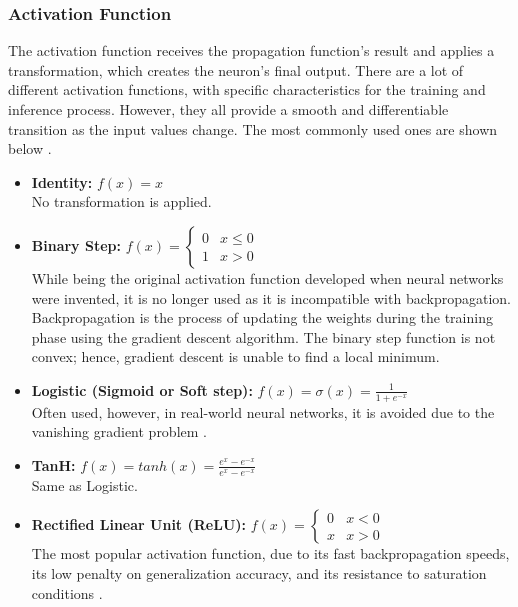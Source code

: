 \subsubsection{Activation Function}
The activation function receives the propagation function's result and applies a transformation, which creates the neuron's final output. There are a lot of different activation functions, with specific characteristics for the training and inference process. However, they all provide a smooth and differentiable transition as the input values change. The most commonly used ones are shown below \cite{Activation-Function-Wikipedia}.
\begin{itemize}
	\item \textbf{Identity:} $f(x) = x$\\
	No transformation is applied.

	\item \textbf{Binary Step:} $
		      f(x) =
		      \begin{cases}
			      0 & x \leq 0 \\
			      1 & x > 0
		      \end{cases}
		  $\\
		  While being the original activation function developed when neural networks were invented, it is no longer used as it is incompatible with backpropagation. Backpropagation is the process of updating the weights during the training phase using the gradient descent algorithm. The binary step function is not convex; hence, gradient descent is unable to find a local minimum.

	\item \textbf{Logistic (Sigmoid or Soft step):} $
		      f(x) = \sigma(x) = \frac{1}{1 + e^{-x}}
		  $\\
		  Often used, however, in real-world neural networks, it is avoided due to the vanishing gradient problem \cite{The-Vanishing-Gradient-Problem-During-Learning-Recurrent-Neural-Nets-and-Problem-Solutions}.

	\item \textbf{TanH:} $
		      f(x) = tanh(x) = \frac{e^{x} - e^{-x}}{e^{x} - e^{-x}}
		  $\\
		  Same as Logistic.

	\item \textbf{Rectified Linear Unit (ReLU):} $
		      f(x) =
		      \begin{cases}
			      0 & x < 0 \\
			      x & x > 0
		      \end{cases}
		  $\\
		  The most popular activation function, due to its fast backpropagation speeds, its low penalty on generalization accuracy, and its resistance to saturation conditions \cite{ImageNet-Classification-Using-Binary-Convolutional-Neural-Networks}.


\end{itemize}
